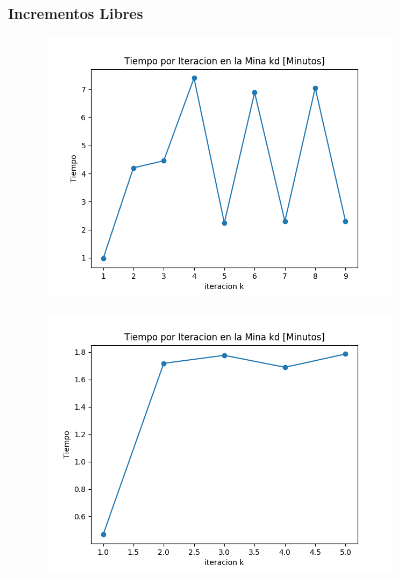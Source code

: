 \documentclass[12pt,letterpaper]{article}
\begin{document}
\begin{figure}[H]
  \captionsetup[subfigure]{labelformat=empty}
  \centering
  \textbf{Incrementos Libres}
  
  \begin{subfigure}[b]{0.4\textwidth}
     \includegraphics[width=\textwidth]{Graficos/FiltradosCauchyLibre/kd_inc_times..png}
     \caption{}
     \label{fig:ex1}
  \end{subfigure}
  \begin{subfigure}[b]{0.4\textwidth}
     \includegraphics[width=\textwidth]{Graficos/Modelo2_Libre_Cauchy/kd_inc_times..png}
     \caption{}
     \label{fig:ex2}
  \end{subfigure}
\end{figure}
\end{document}
